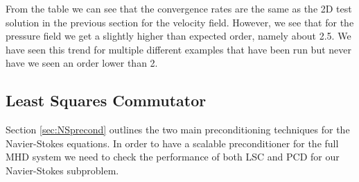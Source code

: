\noindent From the table we can see that the convergence rates are the same as the 2D test solution in the previous section for the velocity field. However, we see that for the pressure field we get a slightly higher than expected order, namely about 2.5. We have seen this trend for multiple different examples that have been run but never have we seen an order lower than 2.

\subsection{Least Squares Commutator}

Section \ref{sec:NSprecond} outlines the two main preconditioning techniques for the Navier-Stokes equations. In order to have a scalable preconditioner for the full MHD system we need to check the performance of both LSC and PCD for our Navier-Stokes subproblem.

